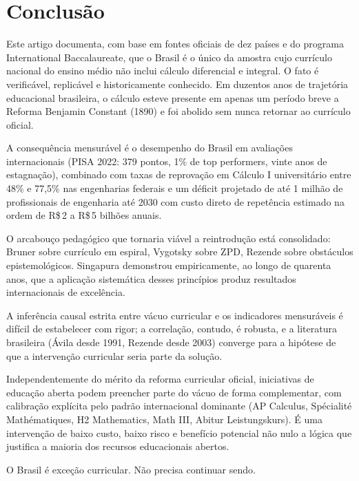 \documentclass[12pt,a4paper,oneside]{article}
\begin{document}
\section{Conclusão}

Este artigo documenta, com base em fontes oficiais de dez
países e do programa International Baccalaureate, que o Brasil é o
único da amostra cujo currículo nacional do ensino médio não inclui
cálculo diferencial e integral. O fato é verificável, replicável e
historicamente conhecido. Em duzentos anos de trajetória educacional
brasileira, o cálculo esteve presente em apenas um período breve
\textemdash{} a Reforma Benjamin Constant (1890)
\textemdash{} e foi abolido sem nunca retornar ao currículo oficial.

A consequência mensurável é o desempenho do Brasil em avaliações
internacionais (PISA 2022: 379 pontos, 1\% de top performers,
vinte anos de estagnação), combinado com taxas de reprovação em
Cálculo I universitário entre 48\% e 77,5\% nas engenharias
federais e um déficit projetado de até 1 milhão de profissionais de
engenharia até 2030 \textemdash{} com custo direto de repetência
estimado na ordem de R\$\,2 a R\$\,5 bilhões anuais.

O arcabouço pedagógico que tornaria viável a reintrodução está
consolidado: Bruner sobre currículo em espiral, Vygotsky sobre
ZPD, Rezende sobre obstáculos epistemológicos. Singapura demonstrou
empiricamente, ao longo de quarenta anos, que a aplicação
sistemática desses princípios produz resultados internacionais de
excelência.

A inferência causal estrita entre vácuo curricular e os indicadores
mensuráveis é difícil de estabelecer com rigor; a correlação,
contudo, é robusta, e a literatura brasileira (Ávila desde 1991,
Rezende desde 2003) converge para a hipótese de que a intervenção
curricular seria parte da solução.

Independentemente do mérito da reforma curricular oficial,
iniciativas de educação aberta podem preencher parte do vácuo de
forma complementar, com calibração explícita pelo padrão
internacional dominante (AP Calculus, Spécialité Mathématiques, H2
Mathematics, Math III, Abitur Leistungskurs). É uma intervenção de
baixo custo, baixo risco e benefício potencial não nulo
\textemdash{} a lógica que justifica a maioria dos recursos
educacionais abertos.

O Brasil é exceção curricular. Não precisa continuar sendo.

\end{document}
